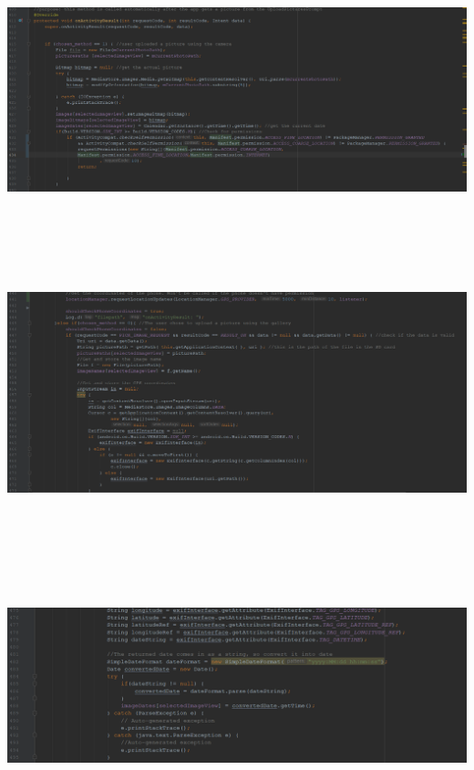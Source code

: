 \documentclass[onecolumn, draftclsnofoot,10pt, compsoc]{IEEEtran}
\begin{document}
\begin{center}
\includegraphics[height=8cm, width=18cm]{onactivityresults1.png}
\end{center}


\begin{center}
\includegraphics[height=8cm]{onactivityresults12.png}
\end{center}

\begin{center}
\includegraphics[height=8cm, width=18cm]{onactivityresults3.png}
\end{center}
\end{document}
